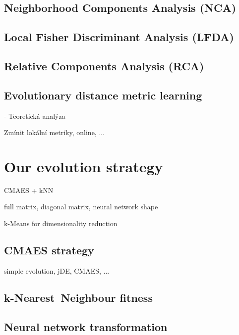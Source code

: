 \documentclass[12pt,a4paper]{report}
\begin{document}
\section{Neighborhood Components Analysis (NCA)} \label{chap:rw:nca}
\cite{jacobgoldberger2004neighbourhood}

\section{Local Fisher Discriminant Analysis (LFDA)} \label{chap:rw:lfda}
\cite{sugiyama2007dimensionality}

\section{Relative Components Analysis (RCA)} \label{chap:rw:rca}
\cite{shental2002adjustment}

\section{Evolutionary distance metric learning} \label{chap:rw:fukui}
\cite{fukui2013evolutionary}


- Teoretická analýza

Zmínit lokální metriky, online, ...


\chapter{Our evolution strategy} \label{chap:our-method}

CMAES + kNN

full matrix, diagonal matrix, neural network shape

k-Means for dimensionality reduction

\section{CMAES strategy}

simple evolution, jDE, CMAES, ...

\section{k-Nearest~Neighbour fitness}

\section{Neural network transformation}
\end{document}
